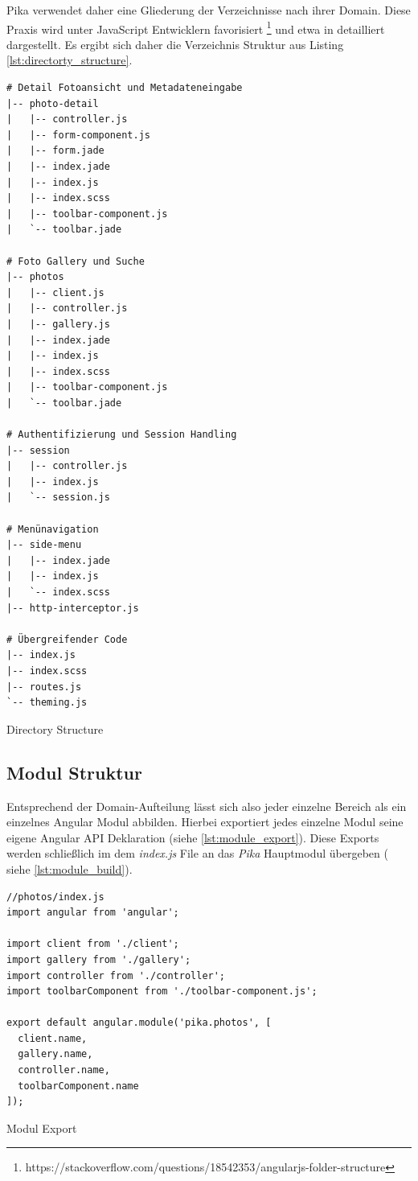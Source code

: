 Pika verwendet daher eine Gliederung der Verzeichnisse nach ihrer Domain. Diese Praxis wird unter JavaScript Entwicklern favorisiert \footnote{https://stackoverflow.com/questions/18542353/angularjs-folder-structure} und etwa in \cite{Kukic:2014} detailliert dargestellt. Es ergibt sich daher die Verzeichnis Struktur aus Listing \ref{lst:directorty_structure}.


\begin{listing}[H]
\begin{verbatim}
# Detail Fotoansicht und Metadateneingabe
|-- photo-detail
|   |-- controller.js
|   |-- form-component.js
|   |-- form.jade
|   |-- index.jade
|   |-- index.js
|   |-- index.scss
|   |-- toolbar-component.js
|   `-- toolbar.jade

# Foto Gallery und Suche
|-- photos
|   |-- client.js
|   |-- controller.js
|   |-- gallery.js
|   |-- index.jade
|   |-- index.js
|   |-- index.scss
|   |-- toolbar-component.js
|   `-- toolbar.jade

# Authentifizierung und Session Handling
|-- session
|   |-- controller.js
|   |-- index.js
|   `-- session.js

# Menünavigation
|-- side-menu
|   |-- index.jade
|   |-- index.js
|   `-- index.scss
|-- http-interceptor.js

# Übergreifender Code
|-- index.js
|-- index.scss
|-- routes.js
`-- theming.js
\end{verbatim}
\caption{Directory Structure}
\label{lst:directorty_structure}
\end{listing}

\subsection{Modul Struktur}

Entsprechend der Domain-Aufteilung lässt sich also jeder einzelne Bereich als ein einzelnes Angular Modul abbilden. Hierbei exportiert jedes einzelne Modul seine eigene Angular API Deklaration (siehe \ref{lst:module_export}). Diese Exports werden schließlich im dem \textit{index.js} File an das \textit{Pika} Hauptmodul übergeben ( siehe \ref{lst:module_build}).


\begin{listing}[H]
\begin{verbatim}
//photos/index.js
import angular from 'angular';

import client from './client';
import gallery from './gallery';
import controller from './controller';
import toolbarComponent from './toolbar-component.js';

export default angular.module('pika.photos', [
  client.name,
  gallery.name,
  controller.name,
  toolbarComponent.name
]);

\end{verbatim}
\caption{Modul Export}
\label{lst:module_export}
\end{listing}

